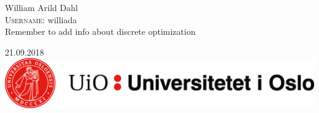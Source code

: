 \documentclass[a4paper, norsk, 12pt]{article}
\begin{document}
\begin{titlepage}
William Arild Dahl\\ %
\textsc{Username:} williada\\[3cm]
Remember to add info about discrete optimization



{\large 21.09.2018}\\[2cm] %


\includegraphics[width=1\textwidth]{uio_banner.png}\\[1cm] %


\vfill %
\end{titlepage}

\end{document}

